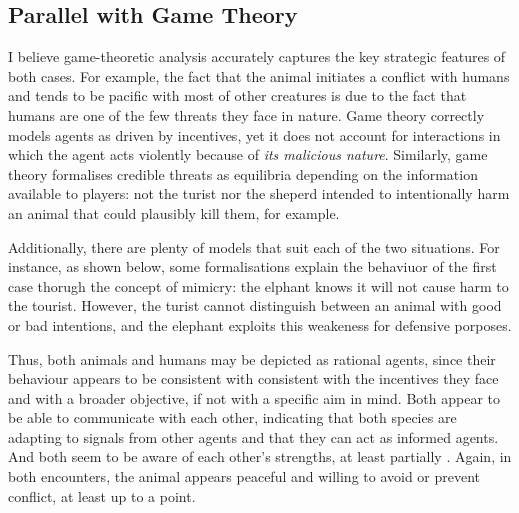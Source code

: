 \subsection{Parallel with Game Theory}
I believe game-theoretic analysis accurately captures the key strategic features of both cases. For example, the fact that the animal initiates a conflict with humans and tends to be pacific with most of other creatures is due to the fact that humans are one of the few threats they face in nature. Game theory correctly models agents as driven by incentives, yet it does not account for interactions in which the agent acts violently because of \textit{its malicious nature}. Similarly, game theory formalises credible threats as equilibria depending on the information available to players: not the turist nor the sheperd intended to intentionally harm an animal that could plausibly kill them, for example.

\vspace*{1em}
Additionally, there are plenty of models that suit each of the two situations. For instance, as shown below, some formalisations explain the behaviuor of the first case thorugh the concept of mimicry: the elphant knows it will not cause harm to the tourist. However, the turist cannot distinguish between an animal with good or bad intentions, and the elephant exploits this weakeness for defensive porposes.

\vspace*{1em}
Thus, both animals and humans may be depicted as rational agents, since their behaviour appears to be consistent with consistent with the incentives they face and with a broader objective, if not with a specific aim in mind. Both appear to be able to communicate with each other, indicating that both species are adapting to signals from other agents and that they can act as informed agents. And both seem to be aware of each other's strengths, at least partially \parencite{smithLogicAnimalConflict1973,schellingStrategyConflict1960}. Again, in both encounters, the animal appears peaceful and willing to avoid or prevent conflict, at least up to a point.


